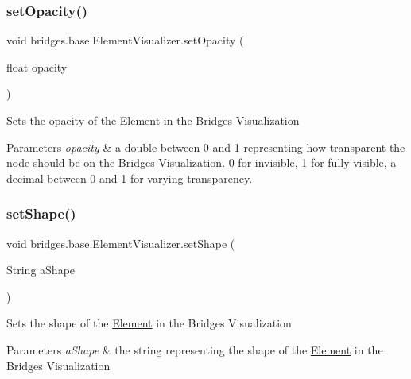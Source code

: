 \subsubsection{\texorpdfstring{set\+Opacity()}{setOpacity()}}
{\footnotesize\ttfamily void bridges.\+base.\+Element\+Visualizer.\+set\+Opacity (\begin{DoxyParamCaption}\item[{float}]{opacity }\end{DoxyParamCaption})}

Sets the opacity of the \hyperlink{classbridges_1_1base_1_1_element}{Element} in the Bridges Visualization


\begin{DoxyParams}{Parameters}
{\em opacity} & a double between 0 and 1 representing how transparent the node should be on the Bridges Visualization. 0 for invisible, 1 for fully visible, a decimal between 0 and 1 for varying transparency. \\
\hline
\end{DoxyParams}
\hypertarget{classbridges_1_1base_1_1_element_visualizer_ac3bad991904c8ad23e5233b341381d93}{}\label{classbridges_1_1base_1_1_element_visualizer_ac3bad991904c8ad23e5233b341381d93} 
\subsubsection{\texorpdfstring{set\+Shape()}{setShape()}}
{\footnotesize\ttfamily void bridges.\+base.\+Element\+Visualizer.\+set\+Shape (\begin{DoxyParamCaption}\item[{String}]{a\+Shape }\end{DoxyParamCaption})}

Sets the shape of the \hyperlink{classbridges_1_1base_1_1_element}{Element} in the Bridges Visualization


\begin{DoxyParams}{Parameters}
{\em a\+Shape} & the string representing the shape of the \hyperlink{classbridges_1_1base_1_1_element}{Element} in the Bridges Visualization \\
\hline
\end{DoxyParams}
\hypertarget{classbridges_1_1base_1_1_element_visualizer_aba410184f7df495594fc1fa7948335a5}{}\label{classbridges_1_1base_1_1_element_visualizer_aba410184f7df495594fc1fa7948335a5} 
